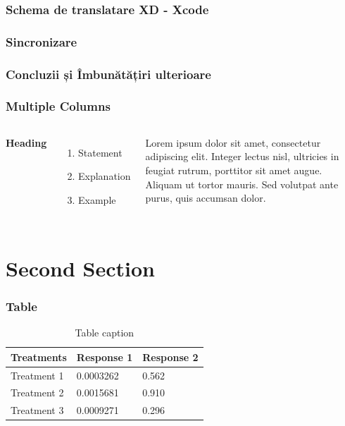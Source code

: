 \documentclass{beamer}
\begin{document}

\begin{frame}
\frametitle{Schema de translatare XD - Xcode}
\end{frame}


\begin{frame}
\frametitle{Sincronizare}
\end{frame}


\begin{frame}
\frametitle{Concluzii și Îmbunătățiri ulterioare}
\end{frame}


\begin{frame}
\frametitle{Multiple Columns}
\begin{columns}[c] %

\textbf{Heading}
\begin{enumerate}
\item Statement
\item Explanation
\item Example
\end{enumerate}

Lorem ipsum dolor sit amet, consectetur adipiscing elit. Integer lectus nisl, ultricies in feugiat rutrum, porttitor sit amet augue. Aliquam ut tortor mauris. Sed volutpat ante purus, quis accumsan dolor.

\end{columns}
\end{frame}

\section{Second Section}

\begin{frame}
\frametitle{Table}
\begin{table}
\begin{tabular}{l l l}
\toprule
\textbf{Treatments} & \textbf{Response 1} & \textbf{Response 2}\\
\midrule
Treatment 1 & 0.0003262 & 0.562 \\
Treatment 2 & 0.0015681 & 0.910 \\
Treatment 3 & 0.0009271 & 0.296 \\
\bottomrule
\end{tabular}
\caption{Table caption}
\end{table}
\end{frame}
\end{document}
